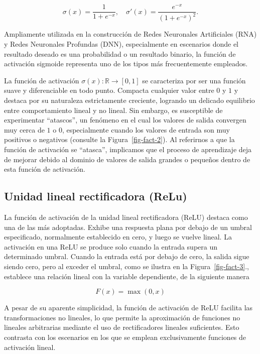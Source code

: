 \documentclass[
  us-letterpaper,
]{scrreprt}
\theoremstyle{plain}
\theoremstyle{definition}
\theoremstyle{plain}
\theoremstyle{definition}
\theoremstyle{remark}
\begin{document}
\[\sigma(x) = \frac{1}{1+e^{-x}}, \quad \sigma'(x) = \frac{e^{-x}}{(1+e^{-x})^2}.\]

Ampliamente utilizada en la construcción de Redes Neuronales
Artificiales (RNA) y Redes Neuronales Profundas (DNN), especialmente en
escenarios donde el resultado deseado es una probabilidad o un resultado
binario, la función de activación sigmoide representa uno de los tipos
más frecuentemente empleados.

La función de activación \(\sigma(x):\mathbb R\to [0,1]\) se caracteriza
por ser una función suave y diferenciable en todo punto. Compacta
cualquier valor entre \(0\) y \(1\) y destaca por su naturaleza
estrictamente creciente, logrando un delicado equilibrio entre
comportamiento lineal y no lineal. Sin embargo, es susceptible de
experimentar ``atascos'', un fenómeno en el cual los valores de salida
convergen muy cerca de \(1\) o \(0\), especialmente cuando los valores
de entrada son muy positivos o negativos (consulte la
Figura~\ref{fig-fact-2}). Al referirnos a que la función de activación
se ``atasca'', implicamos que el proceso de aprendizaje deja de mejorar
debido al dominio de valores de salida grandes o pequeños dentro de esta
función de activación.

\subsection{Unidad lineal rectificadora
(ReLu)}\label{unidad-lineal-rectificadora-relu}

La función de activación de la unidad lineal rectificadora (ReLU)
destaca como una de las más adoptadas. Exhibe una respuesta plana por
debajo de un umbral especificado, normalmente establecido en cero, y
luego se vuelve lineal. La activación en una ReLU se produce solo cuando
la entrada supera un determinado umbral. Cuando la entrada está por
debajo de cero, la salida sigue siendo cero, pero al exceder el umbral,
como se ilustra en la Figura~\ref{fig-fact-3}., establece una relación
lineal con la variable dependiente, de la siguiente manera

\[
F(x)=\max(0,x)
\]

A pesar de su aparente simplicidad, la función de activación de ReLU
facilita las transformaciones no lineales, lo que permite la
aproximación de funciones no lineales arbitrarias mediante el uso de
rectificadores lineales suficientes. Esto contrasta con los escenarios
en los que se emplean exclusivamente funciones de activación lineal.
\end{document}
